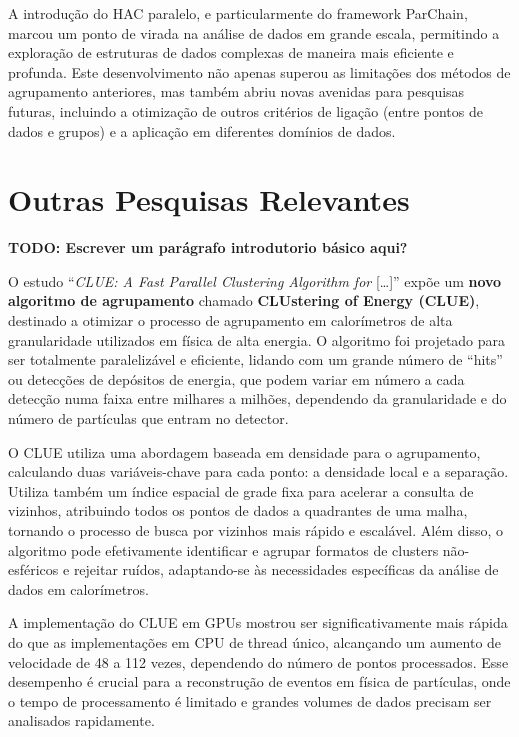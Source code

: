 \documentclass[12pt, %
openright, 
oneside, %
a4paper,    %
brazil]{facom-ufu-abntex2}
\begin{document}
A introdução do HAC paralelo, e particularmente do framework ParChain, marcou um ponto de virada na análise de dados em grande escala, permitindo a exploração de estruturas de dados complexas de maneira mais eficiente e profunda. Este desenvolvimento não apenas superou as limitações dos métodos de agrupamento anteriores, mas também abriu novas avenidas para pesquisas futuras, incluindo a otimização de outros critérios de ligação (entre pontos de dados e grupos) e a aplicação em diferentes domínios de dados.




\section{Outras Pesquisas Relevantes}

\textbf{TODO: Escrever um parágrafo introdutorio básico aqui?}


O estudo \enquote{\textit{CLUE: A Fast Parallel Clustering Algorithm for} [\dots]} \cite{clueParallelAlgo2020} expõe um \textbf{novo algoritmo de agrupamento} chamado \textbf{CLUstering of Energy (CLUE)}, destinado a otimizar o processo de agrupamento em calorímetros de alta granularidade utilizados em física de alta energia. O algoritmo foi projetado para ser totalmente paralelizável e eficiente, lidando com um grande número de \enquote{hits} ou detecções de depósitos de energia, que podem variar em número a cada detecção numa faixa entre milhares a milhões, dependendo da granularidade e do número de partículas que entram no detector.

O CLUE utiliza uma abordagem baseada em densidade para o agrupamento, calculando duas variáveis-chave para cada ponto: a densidade local e a separação. Utiliza também um índice espacial de grade fixa para acelerar a consulta de vizinhos, atribuindo todos os pontos de dados a quadrantes de uma malha, tornando o processo de busca por vizinhos mais rápido e escalável. Além disso, o algoritmo pode efetivamente identificar e agrupar formatos de clusters não-esféricos e rejeitar ruídos, adaptando-se às necessidades específicas da análise de dados em calorímetros.

A implementação do CLUE em GPUs mostrou ser significativamente mais rápida do que as implementações em CPU de thread único, alcançando um aumento de velocidade de 48 a 112 vezes, dependendo do número de pontos processados. Esse desempenho é crucial para a reconstrução de eventos em física de partículas, onde o tempo de processamento é limitado e grandes volumes de dados precisam ser analisados rapidamente.
\end{document}
